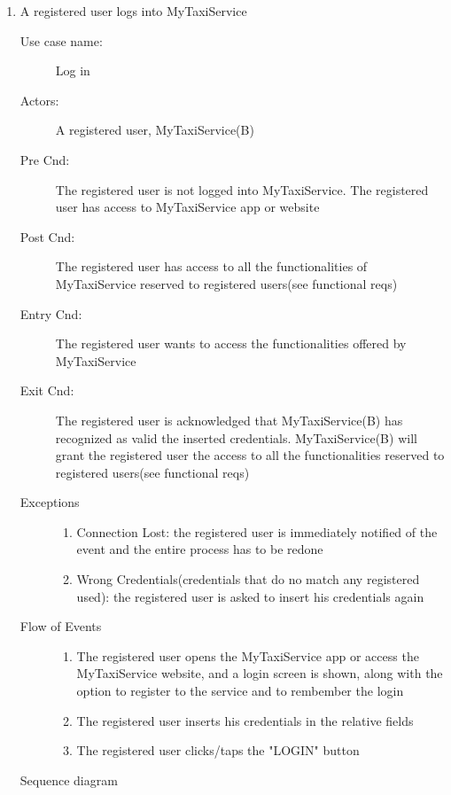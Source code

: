\documentclass[11pt,titlepage]{article} %
\begin{document}
\begin{enumerate}
	
	        \item A registered user logs into MyTaxiService
		\begin{description}
		        \item [Use case name:] Log in
		        \item [Actors:] A registered user, MyTaxiService(B)
		        \item [Pre Cnd:] The registered user is not logged into MyTaxiService. The registered
		        user has access to MyTaxiService app or website
		        \item [Post Cnd:] The registered user has access to all the functionalities of
		        MyTaxiService reserved to registered users(see functional reqs)
		        \item [Entry Cnd:] The registered user wants to access the functionalities offered by MyTaxiService
		        \item [Exit Cnd:]  The registered user is acknowledged that MyTaxiService(B) has recognized as valid the inserted
		        credentials. MyTaxiService(B) will grant the registered user the access to all the functionalities
		        reserved to registered users(see functional reqs)
		        \item [Exceptions]\hfill
			\begin{enumerate}
			          \item Connection Lost: the registered user is immediately notified of the event and the entire process
			          has to be redone
			          \item Wrong Credentials(credentials that do no match any registered used): the registered user is asked to insert his credentials again
			\end{enumerate}
		        \item [Flow of Events]\hfill
			\begin{enumerate}
			          \item The registered user opens the MyTaxiService app or access the MyTaxiService website, and a login
			          screen is shown, along with the option to register to the service and to rembember the login
			          \item The registered user inserts his credentials in the relative fields
			          \item The registered user clicks/taps the "LOGIN" button
			\end{enumerate}
		\end{description}
		Sequence diagram
		\begin{center}

\end{center}
\end{enumerate}
\end{document}
